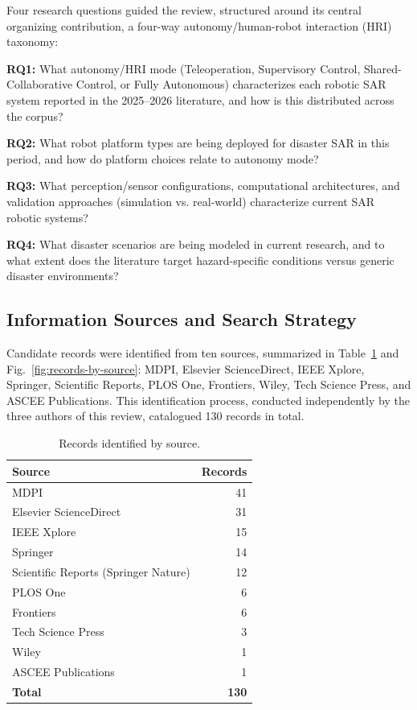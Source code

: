 \documentclass[journal]{IEEEtran}
\begin{document}
Four research questions guided the review, structured around its central organizing contribution, a four-way autonomy/human-robot interaction (HRI) taxonomy:

\textbf{RQ1:} What autonomy/HRI mode (Teleoperation, Supervisory Control, Shared-Collaborative Control, or Fully Autonomous) characterizes each robotic SAR system reported in the 2025--2026 literature, and how is this distributed across the corpus?

\textbf{RQ2:} What robot platform types are being deployed for disaster SAR in this period, and how do platform choices relate to autonomy mode?

\textbf{RQ3:} What perception/sensor configurations, computational architectures, and validation approaches (simulation vs. real-world) characterize current SAR robotic systems?

\textbf{RQ4:} What disaster scenarios are being modeled in current research, and to what extent does the literature target hazard-specific conditions versus generic disaster environments?

\subsection{Information Sources and Search Strategy}

Candidate records were identified from ten sources, summarized in Table~\ref{tab:records-by-source} and Fig.~\ref{fig:records-by-source}: MDPI, Elsevier ScienceDirect, IEEE Xplore, Springer, Scientific Reports, PLOS One, Frontiers, Wiley, Tech Science Press, and ASCEE Publications. This identification process, conducted independently by the three authors of this review, catalogued 130 records in total.

\begin{table}[t]
\caption{Records identified by source.}
\label{tab:records-by-source}
\centering
\footnotesize
\begin{tabular}{@{}p{}r@{}}
\toprule
\textbf{Source} & \textbf{Records} \\
\midrule
MDPI & 41 \\
Elsevier ScienceDirect & 31 \\
IEEE Xplore & 15 \\
Springer & 14 \\
Scientific Reports (Springer Nature) & 12 \\
PLOS One & 6 \\
Frontiers & 6 \\
Tech Science Press & 3 \\
Wiley & 1 \\
ASCEE Publications & 1 \\
\midrule
\textbf{Total} & \textbf{130} \\
\bottomrule
\end{tabular}
\end{table}
\end{document}
